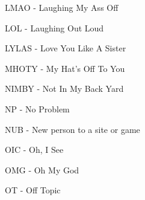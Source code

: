 \documentclass[12pt]{report}
\begin{document}
\begin{adjustwidth}{0.5in}{0.0in}
LMAO - Laughing My Ass Off\par

\end{adjustwidth}

\begin{adjustwidth}{0.5in}{0.0in}
LOL - Laughing Out Loud \par

\end{adjustwidth}

\begin{adjustwidth}{0.5in}{0.0in}
LYLAS - Love You Like A Sister\par

\end{adjustwidth}

\begin{adjustwidth}{0.5in}{0.0in}
MHOTY - My Hat's Off To You\par

\end{adjustwidth}

\begin{adjustwidth}{0.5in}{0.0in}
NIMBY - Not In My Back Yard\par

\end{adjustwidth}

\begin{adjustwidth}{0.5in}{0.0in}
NP - No Problem\par

\end{adjustwidth}

\begin{adjustwidth}{0.5in}{0.0in}
NUB - New person to a site or game\par

\end{adjustwidth}

\begin{adjustwidth}{0.5in}{0.0in}
OIC - Oh, I See\par

\end{adjustwidth}

\begin{adjustwidth}{0.5in}{0.0in}
OMG - Oh My God\par

\end{adjustwidth}

\begin{adjustwidth}{0.5in}{0.0in}
OT - Off Topic\par

\end{adjustwidth}
\end{document}
